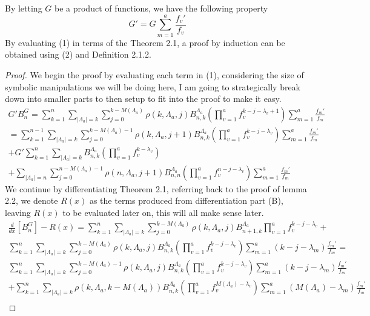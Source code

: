 \documentclass[11pt]{article}
\theoremstyle{plain}
\theoremstyle{definition}
\begin{document}
By letting $G$ be a product of functions, we have the following property
\begin{equation*}
    G'=G\sum_{m=1}^a \frac{f_v'}{f_v}
\end{equation*}
By evaluating (1) in terms of the Theorem 2.1, a proof by induction can be obtained using (2) and Definition 2.1.2.
\begin{proof}
We begin the proof by evaluating each term in (1), considering the size of symbolic manipulations we will be doing here, I am going to strategically break down into smaller parts to then setup to fit into the proof to make it easy. 
\begin{align*}
G'B_n^G = \sum_{k=1}^n \sum_{|\Lambda_a|=k} \sum_{j=0}^{k-M(\Lambda_a)} \rho(k,\Lambda_a,j) B_{n,k}^{\Lambda_a} \left(\prod_{v=1}^af_v^{k-j-\lambda_v+1}\right) \sum_{m=1}^a \frac{f_m'}{f_m} \\
= \sum_{k=1}^{n-1} \sum_{|\Lambda_a|=k} \sum_{j=0}^{k-M(\Lambda_a)-1} \rho(k,\Lambda_a,j+1) B_{n,k}^{\Lambda_a}\left(\prod_{v=1}^af_v^{k-j-\lambda_v}\right) \sum_{m=1}^a \frac{f_m'}{f_m}\\
+ G' \sum_{k=1}^n \sum_{|\Lambda_a|=k}B_{n,k}^{\Lambda_a} \left(\prod_{v=1}^af_v^{k-\lambda_v}\right)\\
+\sum_{|\Lambda_a|=n} \sum_{j=0}^{n-M(\Lambda_a)-1}\rho(n,\Lambda_a,j+1)B_{n,n}^{\Lambda_a} \left(\prod_{v=1}^af_v^{n-j-\lambda_v}\right)\sum_{m=1}^a \frac{f_m'}{f_m} \tag{P.1}
\end{align*}
We continue by differentiating Theorem 2.1, referring back to the proof of lemma 2.2, we denote $R(x)$ as the terms produced from differentiation part (B), leaving $R(x)$ to be evaluated later on, this will all make sense later.
\begin{align*}
\frac{d}{dx}\left[B_n^G\right] -R(x) = \sum_{k=1}^n \sum_{|\Lambda_a|=k} \sum_{j=0}^{k-M(\Lambda_a)}\rho(k,\Lambda_a,j)B_{n+1,k}^{\Lambda_a} \prod_{v=1}^a f_v^{k-j-\lambda_v} +\\
\sum_{k=1}^n \sum_{|\Lambda_a|=k} \sum_{j=0}^{k-M(\Lambda_a)}\rho(k,\Lambda_a,j)B_{n,k}^{\Lambda_a}\left(\prod_{v=1}^a f_v^{k-j-\lambda_v}\right) \sum_{m=1}^a (k-j-\lambda_m)\frac{f_m'}{f_m} = \\
\sum_{k=1}^n \sum_{|\Lambda_a|=k}\sum_{j=0}^{k-M(\Lambda_a)-1} \rho(k,\Lambda_a,j)B_{n,k}^{\Lambda_a}\left(\prod_{v=1}^a f_v^{k-j-\lambda_v}\right) \sum_{m=1}^a (k-j-\lambda_m)\frac{f_m'}{f_m}\\
+ \sum_{k=1}^n \sum_{|\Lambda_a|=k} \rho(k,\Lambda_a,k-M(\Lambda_a))B_{n,k}^{\Lambda_a}\left(\prod_{v=1}^a f_v^{M(\Lambda_a)-\lambda_v}\right) \sum_{m=1}^a (M(\Lambda_a)-\lambda_m)\frac{f_m'}{f_m}\\

\end{align*}
\end{proof}
\end{document}
